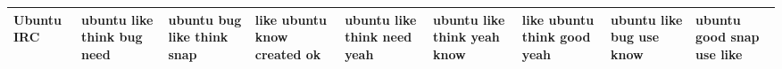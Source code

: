 \documentclass[11pt,a4paper]{article}
\begin{document}
\begin{appendices}
\begin{table*}[htp]
\begin{tiny}
\begin{tabular}{|p{}|p{}|p{}|p{}|p{}|p{}|p{}|p{}|p{}|}
Ubuntu IRC & ubuntu \newline like \newline think \newline bug \newline need & ubuntu \newline bug \newline like \newline think \newline snap & like \newline ubuntu \newline know \newline created \newline ok & ubuntu \newline like \newline think \newline need \newline yeah & ubuntu \newline like \newline think \newline yeah \newline know & like \newline ubuntu \newline think \newline good \newline yeah & ubuntu \newline like \newline bug \newline use \newline know & ubuntu \newline good \newline snap \newline use \newline like\\\hline

\end{tabular}
\end{tiny}
\end{table*}
\end{appendices}
\end{document}
